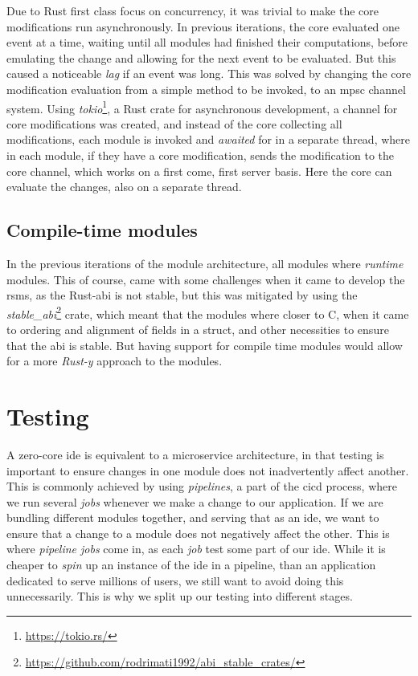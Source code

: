 Due to Rust first class focus on concurrency, it was trivial to make the core
modifications run asynchronously. In previous iterations, the core evaluated
one event at a time, waiting until all modules had finished their computations,
before emulating the change and allowing for the next event to be evaluated. But
this caused a noticeable \textit{lag} if an event was long. This was solved by
changing the core modification evaluation from a simple method to be invoked, to
an \gls*{mpsc} channel system. Using \textit{tokio}\footnote{\url{https://tokio.rs/}},
a Rust crate for asynchronous development, a channel for core modifications was
created, and instead of the core collecting all modifications, each module is
invoked and \textit{awaited} for in a separate thread, where in each module, if
they have a core modification, sends the modification to the core channel, which
works on a first come, first server basis. Here the core can evaluate the
changes, also on a separate thread.

\subsection{Compile-time modules}

In the previous iterations of the module architecture, all modules where
\textit{runtime} modules. This of course, came with some challenges when it came
to develop the \gls*{rsms}, as the Rust-\gls*{abi} is not stable, but this was
mitigated by using the \textit{stable\_abi}\footnote{\url{https://github.com/rodrimati1992/abi\_stable\_crates/}}
crate, which meant that the modules where closer to C, when it came to ordering
and alignment of fields in a struct, and other necessities to ensure that the
\gls*{abi} is stable. But having support for compile time modules would allow
for a more \textit{Rust-y} approach to the modules.

\section{Testing} \label{sec:testing}

A zero-core \gls*{ide} is equivalent to a microservice architecture, in that
testing is important to ensure changes in one module does not inadvertently
affect another. This is commonly achieved by using \textit{pipelines}, a part
of the \gls*{cicd} process, where we run several \textit{jobs} whenever we make a
change to our application. If we are bundling different modules together, and
serving that as an \gls*{ide}, we want to ensure that a change to a module does
not negatively affect the other. This is where \textit{pipeline jobs} come in,
as each \textit{job} test some part of our \gls*{ide}. While it is cheaper to
\textit{spin} up an instance of the \gls*{ide} in a pipeline, than an application
dedicated to serve millions of users, we still want to avoid doing this
unnecessarily. This is why we split up our testing into different stages.

